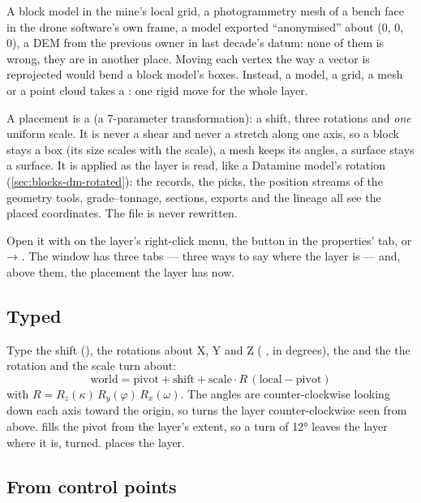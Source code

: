 A block model in the mine's local grid, a photogrammetry mesh of a bench face in the drone software's
own frame, a model exported \enquote{anonymised} about (0, 0, 0), a DEM from the previous owner in last
decade's datum: none of them is wrong, they are in another place. Moving each vertex the way a vector is
reprojected would bend a block model's boxes. Instead, a model, a grid, a mesh or a point cloud takes a
: one rigid move for the whole layer.

A placement is a  (a 7-parameter  transformation): a shift, three
rotations and \emph{one} uniform scale. It is never a shear and never a stretch along one axis, so a block
stays a box (its size scales with the scale), a mesh keeps its angles, a surface stays a surface. It is
applied as the layer is read, like a Datamine model's rotation (\cref{sec:blocks-dm-rotated}): the
records, the picks, the position streams of the geometry tools, grade–tonnage, sections, exports and the
lineage all see the placed coordinates. The file is never rewritten.

Open it with  on the layer's right-click menu, the 
button in the properties'  tab, or  → . The window has three tabs —
three ways to say where the layer is — and, above them, the placement the layer has now.

\subsection{Typed}

Type the shift (), the rotations about X, Y and Z (  , in degrees), the
 and the  the rotation and the scale turn about:
\[ \text{world} = \text{pivot} + \text{shift} + \text{scale} \cdot R\,(\text{local} - \text{pivot}) \]
with $R = R_z(\kappa)\,R_y(\varphi)\,R_x(\omega)$.
The angles are counter-clockwise looking down each axis toward the origin, so  turns the layer
counter-clockwise seen from above.  fills the pivot from the layer's
extent, so a turn of 12° leaves the layer where it is, turned.  places the layer.

\subsection{From control points}\label{sec:crs-gcp}

